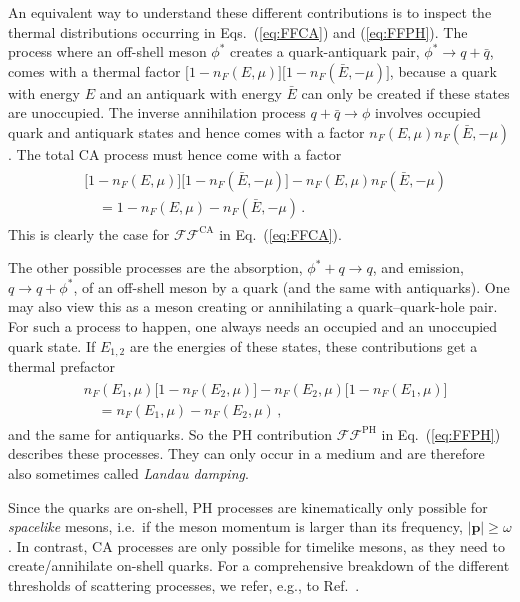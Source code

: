 \documentclass[reprint,english,superscriptaddress,preprintnumbers,amsmath,amssymb,aps,prd,nofootinbib]{revtex4-2}
\newcommand{\bs}[1]{\boldsymbol{#1}}
\def\eq#1{(\ref{#1})}
\def\Eq#1{Eq.~(\ref{#1})}
\begin{document}
An equivalent way to understand these different contributions is to inspect the thermal distributions occurring in Eqs.\ \eq{eq:FFCA} and \eq{eq:FFPH}. The process where an off-shell meson $\phi^*$ creates a quark-antiquark pair, $\phi^*\rightarrow q + \bar q$, comes with a thermal factor $\big[1-n_F(E,\mu)\big]\big[1-n_F(\bar E,-\mu)\big]$,
because a quark with energy $E$ and an antiquark with energy $\bar  E$ can only be created if these states are unoccupied. The inverse annihilation process $ q + \bar q \rightarrow \phi$ involves occupied quark and antiquark states and hence comes with a factor $n_F(E,\mu) n_F(\bar E,-\mu)$. The total CA process must hence come with a factor
\begin{align}
\begin{split}
    &\big[1-n_F(E,\mu)\big]\big[1-n_F(\bar E,-\mu)\big]- n_F(E,\mu) n_F(\bar E,-\mu)\\
    &\quad= 1 -n_F(E,\mu) -n_F(\bar E,-\mu)\,.  
\end{split}
\end{align}
This is clearly the case for $\mathcal{FF}^{\mathrm{CA}}$ in \Eq{eq:FFCA}.

The other possible processes are the absorption, $\phi^* + q \rightarrow q$, and emission, $q \rightarrow q + \phi^* $, of an off-shell meson by a quark (and the same with antiquarks). One may also view this as a meson creating or annihilating a quark--quark-hole pair. For such a process to happen, one always needs an occupied and an unoccupied quark state. If $E_{1,2}$ are the energies of these states, these contributions get a thermal prefactor
\begin{align}
\begin{split}
      &n_F(E_1,\mu)\big[1-n_F(E_2,\mu)\big] -n_F(E_2,\mu)\big[1-n_F(E_1,\mu)\big]\\ 
      &\quad = n_F(E_1,\mu) - n_F(E_2,\mu)\,,
\end{split}
\end{align}
and the same for antiquarks. So the PH contribution $\mathcal{FF}^{\mathrm{PH}}$ in \Eq{eq:FFPH} describes these processes. They can only occur in a medium and are therefore also sometimes called \emph{Landau damping}.

Since the quarks are on-shell, PH processes are kinematically only possible for \emph{spacelike} mesons, i.e.\ if the meson momentum is larger than its frequency, $|\bs{p}|\geq \omega$. In contrast, CA processes are only possible for timelike mesons, as they need to create/annihilate on-shell quarks. For a comprehensive breakdown of the different thresholds of scattering processes, we refer, e.g., to Ref.~\cite{Jung:2016yxl}.


    
\end{document}
